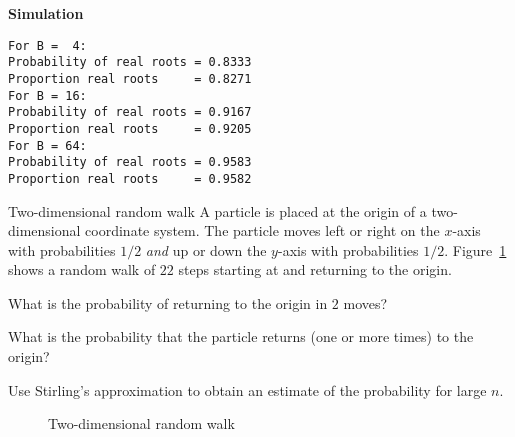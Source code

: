 \textbf{Simulation}
\begin{verbatim}
For B =  4:
Probability of real roots = 0.8333
Proportion real roots     = 0.8271
For B = 16:
Probability of real roots = 0.9167
Proportion real roots     = 0.9205
For B = 64:
Probability of real roots = 0.9583
Proportion real roots     = 0.9582
\end{verbatim}


\begin{prob}{Two-dimensional random walk}
A particle is placed at the origin of a two-dimensional coordinate system. The particle moves left or right on the $x$-axis with probabilities $1/2$ \emph{and} up or down the $y$-axis with probabilities $1/2$. Figure~\ref{f.2d-random-walk} shows a random walk of $22$ steps starting at and returning to the origin.

 What is the probability of returning to the origin in $2$ moves?

 What is the probability that the particle returns (one or more times) to the origin?

 Use Stirling's approximation to obtain an estimate of the probability for large $n$.

\begin{figure}[t]
\begin{center}
\end{center}
\caption{Two-dimensional random walk}\label{f.2d-random-walk}
\end{figure}

\end{prob}

